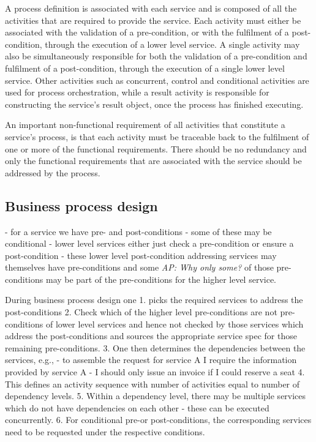A process definition is associated with each service and is composed of all the activities that are required to provide the service. Each activity must either be associated with the validation of a pre-condition, or with the fulfilment of a post-condition, through the execution of a lower level service. A single activity may also be simultaneously responsible for both the validation of a pre-condition and fulfilment of a post-condition, through the execution of a single lower level service. Other activities such as concurrent, control and conditional activities are used for process orchestration, while a result activity is responsible for constructing the service's result object, once the process has finished executing. 

An important non-functional requirement of all activities that constitute a service's process, is that each activity must be traceable back to the fulfilment of one or more of the functional requirements. There should be no redundancy and only the functional requirements that are associated with the service should be addressed by the process.

\subsection{Business process design}
- for a service we have pre- and post-conditions - some of these may be conditional
- lower level services either just check a pre-condition or ensure a post-condition
- these lower level post-condition addressing services may themselves have pre-conditions and some \emph{AP: Why only some?} of those pre-conditions may be part of the pre-conditions for the higher level service.

During business process design one
  1. picks the required services to address the post-conditions
  2. Check which of the higher level pre-conditions are not pre-conditions of lower level services and hence not checked by those services which address the post-conditions and sources the appropriate service spec for those remaining pre-conditions.
  3. One then determines the dependencies between the services, e.g., 
    - to assemble the request for service A I require the information provided by service A
    - I should only issue an invoice if I could reserve a seat
  4. This defines an activity sequence with number of activities equal to number of dependency levels.
  5. Within a dependency level, there may be multiple services which do not have dependencies on each other - these can be executed concurrently.
  6. For conditional pre-or post-conditions, the corresponding services need to be requested under the respective conditions.

